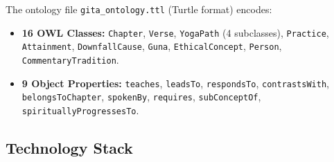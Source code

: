 \documentclass[conference]{IEEEtran}
\begin{document}
The ontology file \texttt{gita\_ontology.ttl} (Turtle format) encodes:
\begin{itemize}[leftmargin=*]
  \item \textbf{16 OWL Classes:} \texttt{Chapter}, \texttt{Verse},
        \texttt{YogaPath} (4 subclasses), \texttt{Practice}, \texttt{Attainment},
        \texttt{DownfallCause}, \texttt{Guna}, \texttt{EthicalConcept},
        \texttt{Person}, \texttt{CommentaryTradition}.
  \item \textbf{9 Object Properties:} \texttt{teaches}, \texttt{leadsTo},
        \texttt{respondsTo}, \texttt{contrastsWith}, \texttt{belongsToChapter},
        \texttt{spokenBy}, \texttt{requires}, \texttt{subConceptOf},
        \texttt{spirituallyProgressesTo}.
\end{itemize}

\subsection{Technology Stack}
\end{document}
